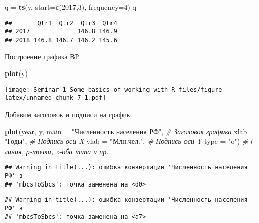 \documentclass[
]{article}
\newenvironment{Shaded}{\begin{snugshade}}{\end{snugshade}}
\newcommand{\AttributeTok}[1]{\textcolor[rgb]{0.13,0.29,0.53}{#1}}
\newcommand{\CommentTok}[1]{\textcolor[rgb]{0.56,0.35,0.01}{\textit{#1}}}
\newcommand{\DecValTok}[1]{\textcolor[rgb]{0.00,0.00,0.81}{#1}}
\newcommand{\FunctionTok}[1]{\textcolor[rgb]{0.13,0.29,0.53}{\textbf{#1}}}
\newcommand{\NormalTok}[1]{#1}
\newcommand{\OtherTok}[1]{\textcolor[rgb]{0.56,0.35,0.01}{#1}}
\newcommand{\StringTok}[1]{\textcolor[rgb]{0.31,0.60,0.02}{#1}}
\begin{document}
\begin{Shaded}
\begin{Highlighting}[]
\NormalTok{q }\OtherTok{=} \FunctionTok{ts}\NormalTok{(y, }\AttributeTok{start=}\FunctionTok{c}\NormalTok{(}\DecValTok{2017}\NormalTok{,}\DecValTok{3}\NormalTok{), }\AttributeTok{frequency=}\DecValTok{4}\NormalTok{) }
\NormalTok{q}
\end{Highlighting}
\end{Shaded}

\begin{verbatim}
##       Qtr1  Qtr2  Qtr3  Qtr4
## 2017             146.8 146.9
## 2018 146.8 146.7 146.2 145.6
\end{verbatim}

Построение графика ВР

\begin{Shaded}
\begin{Highlighting}[]
\FunctionTok{plot}\NormalTok{(y)}
\end{Highlighting}
\end{Shaded}

\texttt{[image: Seminar\_1\_Some-basics-of-working-with-R\_files/figure-latex/unnamed-chunk-7-1.pdf]}

Добавим заголовок и подписи на график

\begin{Shaded}
\begin{Highlighting}[]
\FunctionTok{plot}\NormalTok{(year, y, }
     \AttributeTok{main =} \StringTok{"Численность населения РФ"}\NormalTok{,  }\CommentTok{\# Заголовок графика}
     \AttributeTok{xlab =} \StringTok{"Годы"}\NormalTok{,                      }\CommentTok{\# Подпись оси X}
     \AttributeTok{ylab =} \StringTok{"Млн.чел."}\NormalTok{,                  }\CommentTok{\# Подпись оси Y}
     \AttributeTok{type =} \StringTok{"o"}\NormalTok{)                         }\CommentTok{\# l{-}линия, р{-}точки, o{-}оба типа и пр.}
\end{Highlighting}
\end{Shaded}

\begin{verbatim}
## Warning in title(...): ошибка конвертации 'Численность населения РФ' в
## 'mbcsToSbcs': точка заменена на <d0>
\end{verbatim}

\begin{verbatim}
## Warning in title(...): ошибка конвертации 'Численность населения РФ' в
## 'mbcsToSbcs': точка заменена на <a7>
\end{verbatim}
\end{document}
